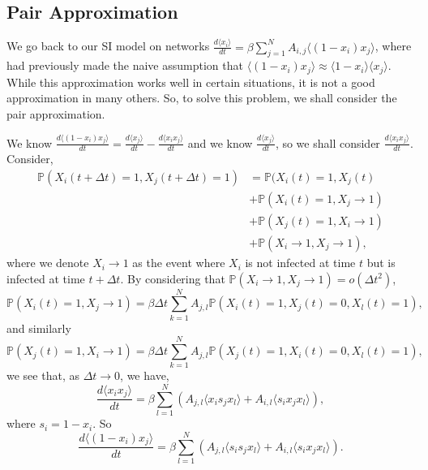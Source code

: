 \documentclass[
]{article}
\theoremstyle{definition}
\begin{document}
\hypertarget{pair-approximation}{%
\subsection{Pair Approximation}\label{pair-approximation}}

We go back to our SI model on networks
\(\frac{d\langle x_i \rangle}{dt} = \beta \sum_{j = 1}^N A_{i, j}\langle (1 - x_i)x_j \rangle\),
where had previously made the naive assumption that
\(\langle (1 - x_i)x_j \rangle \approx \langle 1 - x_i \rangle \langle x_j \rangle\).
While this approximation works well in certain situations, it is not a
good approximation in many others. So, to solve this problem, we shall
consider the pair approximation.

We know
\(\frac{d\langle (1 - x_i) x_j \rangle}{dt} = \frac{d\langle x_j \rangle}{dt} - \frac{d\langle x_i x_j \rangle}{dt}\)
and we know \(\frac{d\langle x_j \rangle}{dt}\), so we shall consider
\(\frac{d\langle x_i x_j \rangle}{dt}\). Consider, \begin{align*}
  \mathbb{P}(X_i (t + \Delta t) = 1, X_j (t + \Delta t) = 1) & = 
    \mathbb{P}(X_i (t) = 1, X_j (t) \\
  & + \mathbb{P}(X_i (t) = 1, X_j \to 1) \\
  & + \mathbb{P}(X_j (t) = 1, X_i \to 1) \\
  & + \mathbb{P}(X_i \to 1, X_j \to 1),
\end{align*} where we denote \(X_i \to 1\) as the event where \(X_i\) is
not infected at time \(t\) but is infected at time \(t + \Delta t\). By
considering that \(\mathbb{P}(X_i \to 1, X_j \to 1) = o(\Delta t^2)\),\\
\[\mathbb{P}(X_i (t) = 1, X_j \to 1) = \beta \Delta t 
  \sum_{k = 1}^N A_{j, l} \mathbb{P}(X_i(t) = 1, X_j(t) = 0, X_l(t) = 1),\]
and similarly \[\mathbb{P}(X_j (t) = 1, X_i \to 1) = \beta \Delta t 
  \sum_{k = 1}^N A_{j, l} \mathbb{P}(X_j(t) = 1, X_i(t) = 0, X_l(t) = 1),\]
we see that, as \(\Delta t \to 0\), we have,
\[\frac{d\langle x_i x_j \rangle}{dt} = \beta \sum_{l = 1}^N 
  \left(A_{j, l} \langle x_i s_j x_l \rangle + A_{i, l} \langle s_i x_j x_l \rangle \right),\]
where \(s_i = 1 - x_i\). So
\[\frac{d\langle (1 - x_i) x_j \rangle}{dt} = \beta \sum_{l = 1}^N 
  \left(A_{j, l} \langle s_i s_j x_l \rangle + A_{i, l} \langle s_i x_j x_l \rangle \right).\]
\end{document}

